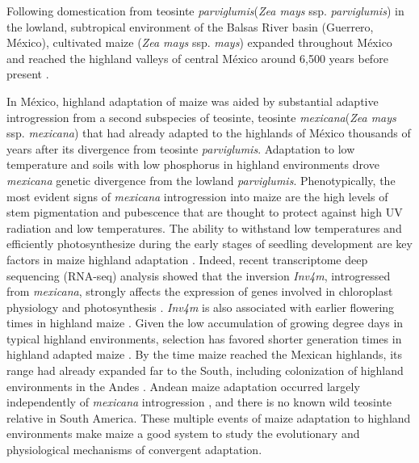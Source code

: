 \documentclass[9pt,twocolumn,twoside,lineno]{biorxiv}
\newcommand{\mex}{\textit{mexicana}\xspace}
\newcommand{\parv}{\textit{parviglumis}\xspace}
\begin{document}
Following domestication from teosinte \parv (\textit{Zea mays} ssp. \parv) \cite{Matsuoka2002-bg,Piperno2009-fj} in the lowland, subtropical environment of the Balsas River basin (Guerrero, M\'exico), cultivated maize (\textit{Zea mays} ssp. \textit{mays}) expanded throughout M\'exico and reached the highland valleys of central M\'exico around 6,500 years before present \cite{Piperno2001-ea}.

In M\'exico, highland adaptation of maize was aided by substantial adaptive introgression from a second subspecies of teosinte, teosinte \mex (\textit{Zea mays} ssp. \mex) that had already adapted to the highlands of M\'exico thousands of years after its divergence from teosinte \parv \cite{Hufford2013-gs, Gonzalez-Segovia2019-jy}. 
Adaptation to low temperature and soils with low phosphorus in highland environments drove \mex genetic divergence from the lowland \parv \cite{AguirreLiguori2019-fl}.
Phenotypically, the most evident signs of \mex introgression into maize are the high levels of stem pigmentation and pubescence \cite{Lauter2004-eq} that are thought to protect against high UV radiation and low temperatures. 
The ability to withstand low temperatures and efficiently photosynthesize during the early stages of seedling development are key factors in maize highland adaptation \cite{Hardacre1980-tq}.
Indeed, recent transcriptome deep sequencing (RNA-seq) analysis showed that the inversion \textit{Inv4m}, introgressed from \mex, strongly affects the expression of genes involved in chloroplast physiology and photosynthesis \cite{Crow2020-gene}.  
\textit{Inv4m} is also associated with earlier flowering times in highland maize \cite{Romero_Navarro2017-cn, Gates2019-xu}. 
Given the low accumulation of growing degree days in typical highland environments, selection has favored shorter generation  times in highland adapted maize \cite{Gates2019-xu}.
By the time maize reached the Mexican highlands, its range had already expanded far to the South, including colonization of highland environments in the  Andes \cite{Athens2016-ep, Grobman2012-pm}. 
Andean maize adaptation occurred largely independently of \mex introgression \cite{Takuno2015-uj, Wang2020-mp}, and there is no known wild teosinte relative in South America. 
These multiple events of maize adaptation to highland environments make maize a good system to study the evolutionary and physiological mechanisms of convergent adaptation. %
\end{document}
